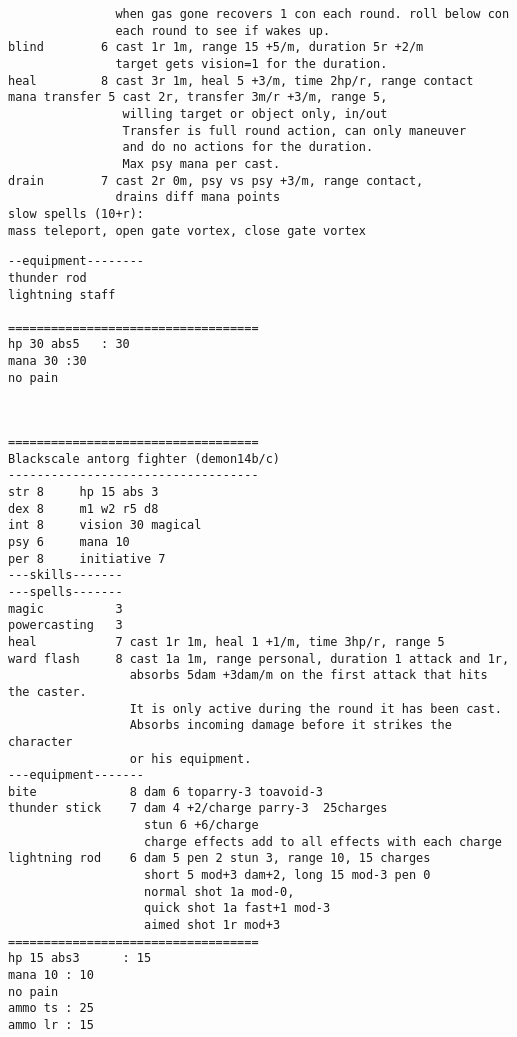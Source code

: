 \begin{samepage}
\begin{verbatim}
               when gas gone recovers 1 con each round. roll below con
               each round to see if wakes up.
blind        6 cast 1r 1m, range 15 +5/m, duration 5r +2/m
               target gets vision=1 for the duration.
heal         8 cast 3r 1m, heal 5 +3/m, time 2hp/r, range contact
mana transfer 5 cast 2r, transfer 3m/r +3/m, range 5,
                willing target or object only, in/out
                Transfer is full round action, can only maneuver
                and do no actions for the duration.
                Max psy mana per cast.
drain        7 cast 2r 0m, psy vs psy +3/m, range contact,
               drains diff mana points
slow spells (10+r):
mass teleport, open gate vortex, close gate vortex
\end{verbatim} \pagebreak[1] \begin{verbatim}
--equipment--------
thunder rod
lightning staff

===================================
hp 30 abs5   : 30
mana 30 :30
no pain
\end{verbatim} \end{samepage} \normalsize

\

\pagebreak[1]
\tiny \begin{samepage} \begin{verbatim}
===================================
Blackscale antorg fighter (demon14b/c)
-----------------------------------
str 8     hp 15 abs 3
dex 8     m1 w2 r5 d8
int 8     vision 30 magical
psy 6     mana 10
per 8     initiative 7
---skills-------
---spells-------
magic          3
powercasting   3
heal           7 cast 1r 1m, heal 1 +1/m, time 3hp/r, range 5
ward flash     8 cast 1a 1m, range personal, duration 1 attack and 1r,
                 absorbs 5dam +3dam/m on the first attack that hits the caster.
                 It is only active during the round it has been cast.
                 Absorbs incoming damage before it strikes the character
                 or his equipment.
---equipment-------
bite             8 dam 6 toparry-3 toavoid-3
thunder stick    7 dam 4 +2/charge parry-3  25charges
                   stun 6 +6/charge
                   charge effects add to all effects with each charge
lightning rod    6 dam 5 pen 2 stun 3, range 10, 15 charges
                   short 5 mod+3 dam+2, long 15 mod-3 pen 0
                   normal shot 1a mod-0,
                   quick shot 1a fast+1 mod-3
                   aimed shot 1r mod+3
===================================
hp 15 abs3      : 15
mana 10 : 10
no pain
ammo ts : 25
ammo lr : 15
\end{verbatim} \end{samepage} \normalsize

